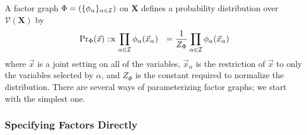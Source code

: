 \documentclass{article}
\newcommand{\V}{\mathcal V}
\numberwithin{equation}{section}
\begin{document}
	
	
	
	A factor graph $\Phi = (\{\phi_\alpha\}_{\alpha \in \cal I})$ on $\mathbf X$ defines a probability distribution over $\V(\mathbf X)$ by 
	\begin{align*}
		\Pr\nolimits_\Phi(\vec x) &:\propto \prod_{\alpha \in \cal I} \phi_\alpha(\vec x_{\alpha}) 
		&= \frac{1}{Z_\Phi} \prod_{\alpha \in \cal I} \phi_\alpha(\vec x_{\alpha})
	\end{align*}
	where $\vec{x}$ is a joint setting on all of the variables, $\vec{x}_\alpha$ is the restriction of $\vec{x}$ to only the variables selected by $\alpha$, and $Z_\Phi$ is the constant required to normalize the distribution. 
	There are several ways of parameterizing factor graphs; we start with the simplest one.
		
	\subsubsection{Specifying Factors Directly}
\end{document}
